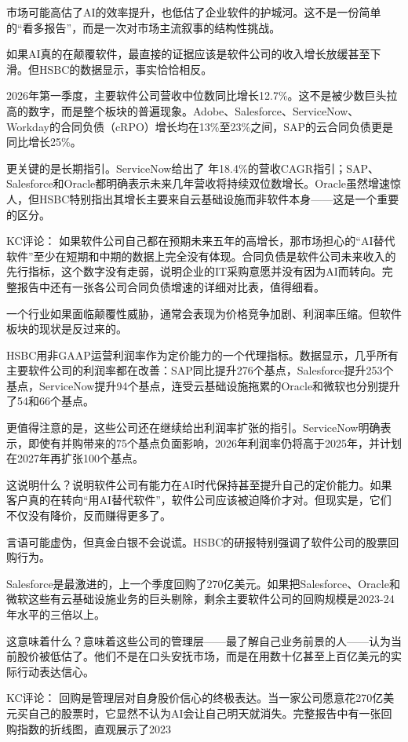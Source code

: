 \documentclass[11pt]{ctexart}
\begin{document}
市场可能高估了AI的效率提升，也低估了企业软件的护城河。这不是一份简单的“看多报告”，而是一次对市场主流叙事的结构性挑战。

如果AI真的在颠覆软件，最直接的证据应该是软件公司的收入增长放缓甚至下滑。但HSBC的数据显示，事实恰恰相反。

2026年第一季度，主要软件公司营收中位数同比增长12.7\%。这不是被少数巨头拉高的数字，而是整个板块的普遍现象。Adobe、Salesforce、ServiceNow、Workday的合同负债（cRPO）增长均在13\%至23\%之间，SAP的云合同负债更是同比增长25\%。

更关键的是长期指引。ServiceNow给出了 年18.4\%的营收CAGR指引；SAP、Salesforce和Oracle都明确表示未来几年营收将持续双位数增长。Oracle虽然增速惊人，但HSBC特别指出其增长主要来自云基础设施而非软件本身——这是一个重要的区分。

KC评论： 如果软件公司自己都在预期未来五年的高增长，那市场担心的“AI替代软件”至少在短期和中期的数据上完全没有体现。合同负债是软件公司未来收入的先行指标，这个数字没有走弱，说明企业的IT采购意愿并没有因为AI而转向。完整报告中还有一张各公司合同负债增速的详细对比表，值得细看。

一个行业如果面临颠覆性威胁，通常会表现为价格竞争加剧、利润率压缩。但软件板块的现状是反过来的。

HSBC用非GAAP运营利润率作为定价能力的一个代理指标。数据显示，几乎所有主要软件公司的利润率都在改善：SAP同比提升276个基点，Salesforce提升253个基点，ServiceNow提升94个基点，连受云基础设施拖累的Oracle和微软也分别提升了54和66个基点。

更值得注意的是，这些公司还在继续给出利润率扩张的指引。ServiceNow明确表示，即使有并购带来的75个基点负面影响，2026年利润率仍将高于2025年，并计划在2027年再扩张100个基点。

这说明什么？说明软件公司有能力在AI时代保持甚至提升自己的定价能力。如果客户真的在转向“用AI替代软件”，软件公司应该被迫降价才对。但现实是，它们不仅没有降价，反而赚得更多了。

言语可能虚伪，但真金白银不会说谎。HSBC的研报特别强调了软件公司的股票回购行为。

Salesforce是最激进的，上一个季度回购了270亿美元。如果把Salesforce、Oracle和微软这些有云基础设施业务的巨头剔除，剩余主要软件公司的回购规模是2023-24年水平的三倍以上。

这意味着什么？意味着这些公司的管理层——最了解自己业务前景的人——认为当前股价被低估了。他们不是在口头安抚市场，而是在用数十亿甚至上百亿美元的实际行动表达信心。

KC评论： 回购是管理层对自身股价信心的终极表达。当一家公司愿意花270亿美元买自己的股票时，它显然不认为AI会让自己明天就消失。完整报告中有一张回购指数的折线图，直观展示了2023
\end{document}
